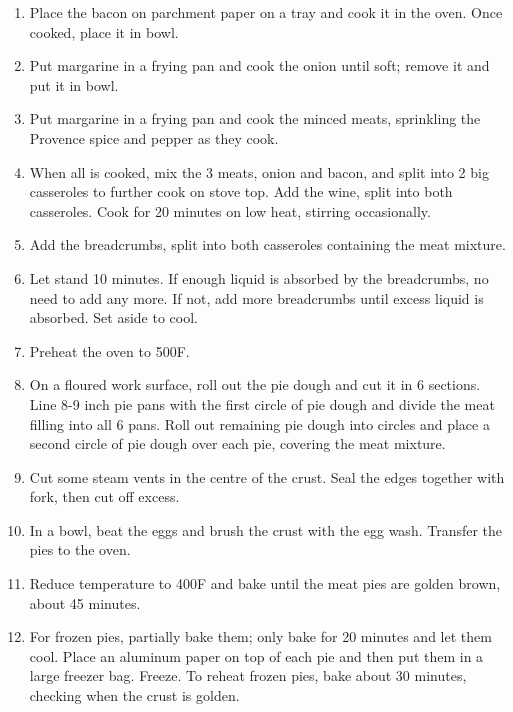 \begin{enumerate}
    \item Place the bacon on parchment paper on a tray and cook it in the oven. Once cooked, place it in bowl.
    \item Put margarine in a frying pan and cook the onion until soft; remove it and put it in bowl.
    \item Put margarine in a frying pan and cook the minced meats, sprinkling the Provence spice and pepper as they cook.
    \item When all is cooked, mix the 3 meats, onion and bacon, and split into 2 big casseroles to further cook on stove top. Add the wine, split into both casseroles. Cook for 20 minutes on low heat, stirring occasionally.
    \item Add the breadcrumbs, split into both casseroles containing the meat mixture.
    \item Let stand 10 minutes. If enough liquid is absorbed by the breadcrumbs, no need to add any more. If not, add more breadcrumbs until excess liquid is absorbed. Set aside to cool.
    \item Preheat the oven to 500\degree F.
    \item On a floured work surface, roll out the pie dough and cut it in 6 sections. Line 8-9 inch pie pans with the first circle of pie dough and divide the meat filling into all 6 pans. Roll out remaining pie dough into circles and place a second circle of pie dough over each pie, covering the meat mixture.
    \item Cut some steam vents in the centre of the crust. Seal the edges together with fork, then cut off excess.
    \item In a bowl, beat the eggs and brush the crust with the egg wash. Transfer the pies to the oven.
    \item Reduce temperature to 400\degree F and bake until the meat pies are golden brown, about 45 minutes.
    \item For frozen pies, partially bake them; only bake for 20 minutes and let them cool. Place an aluminum paper on top of each pie and then put them in a large freezer bag. Freeze. To reheat frozen pies, bake about 30 minutes, checking when the crust is golden.
\end{enumerate}
